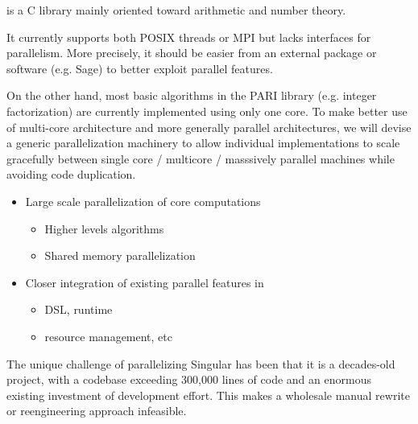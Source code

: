 \begin{workpackage}[id=hpc,wphases=36-48,
  title=High Performance Computing,
  PSRM=1, %
  LLRM=12, %
  SARM=1, %
  UKRM=1, %
  UBRM=1, %
  UJFRM=12]
\begin{wpdescription}
\end{wpdescription}
\begin{tasklist}
\begin{task}[title=PARI,id=hpc_pari]
  \Pari is a C library mainly oriented toward arithmetic and number theory.
  
  It currently supports both POSIX threads or MPI but lacks interfaces for
  parallelism. More precisely, it should be easier from an external package
  or software (e.g. Sage) to better exploit \Pari parallel features.

  On the other hand, most basic algorithms in the PARI library (e.g. integer
  factorization) are currently implemented using only one core. To
  make better use of multi-core architecture and more generally parallel
  architectures, we will devise a generic parallelization machinery
  to allow individual implementations to scale gracefully between single
  core / multicore / masssively parallel machines while avoiding code
  duplication.
\end{task}

\begin{task}[title=GAP,id=hpc_gap]

\end{task}

\begin{task}[title=Linbox,id=hpc_linbox]

  \begin{itemize}
  \item Large scale parallelization of core computations
    \begin{itemize}
    \item Higher levels algorithms
    \item Shared memory parallelization
    \end{itemize}
  \item Closer integration of existing parallel features in \Sage
    \begin{itemize}
    \item DSL, runtime
    \item resource management, etc
    \end{itemize}
  \end{itemize}

\end{task}

\begin{task}[title=Singular]
  \label{task:hpc_singular}
  The unique challenge of parallelizing Singular has been that it is a decades-old
  project, with a codebase exceeding 300,000 lines of code and an enormous existing
  investment of development effort. This makes a wholesale manual rewrite or reengineering
  approach infeasible.


\end{task}
\end{tasklist}
\end{workpackage}
